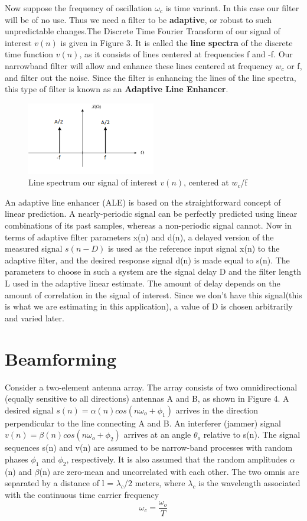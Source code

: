 Now suppose the frequency of oscillation $\omega_c$ is time variant. In this case our filter will be of no use. Thus we need a filter to be \textbf{adaptive}, or robust to such unpredictable changes.The Discrete Time Fourier Transform of our signal of interest $v(n)$ is given in Figure 3. It is called the \textbf{line spectra} of the discrete time function $v(n)$, as it consists of lines centered at frequencies f and -f. Our narrowband filter will allow and enhance these lines centered at frequency $w_c$ or f, and filter out the noise. Since the filter is enhancing the lines of the line spectra, this type of filter is known as an \textbf{Adaptive Line Enhancer}.

\begin{figure}[!ht]
\centering
\includegraphics[width=0.5\textwidth]{cosinedtft.png}
\caption{\label{fig:cosinedtft}Line spectrum our signal of interest $v(n)$, centered at $w_c$/f}
\end{figure}


An adaptive line enhancer (ALE) is based on the straightforward concept of linear prediction. A nearly-periodic signal can be perfectly predicted using linear combinations of its past samples, whereas a non-periodic signal cannot. Now in terms of adaptive filter parameters x(n) and d(n), a delayed version of the measured signal $s(n-D)$ is used as the reference input signal x(n) to the adaptive filter, and the desired response signal d(n) is made equal to s(n). The parameters to choose in such a system are the signal delay D and the filter length L used in the adaptive linear estimate. The amount of delay depends on the amount of correlation in the signal of interest. Since we don't have this signal(this is what we are estimating in this application), a value of D is chosen arbitrarily and varied later.
\section{Beamforming}
Consider a two-element antenna array. The
array consists of two omnidirectional (equally sensitive to all directions) antennas A and
B, as shown in Figure 4. A desired signal $s(n) = \alpha(n) cos(n\omega_o + \phi_1)$ arrives in the
direction perpendicular to the line connecting A and B. An interferer (jammer) signal
$v(n) = \beta(n) cos(n\omega_o+ \phi_2)$ arrives at an angle $\theta_o$ relative to s(n). The signal sequences
s(n) and v(n) are assumed to be narrow-band processes with random phases $\phi_1$ and $\phi_2$,
respectively. It is also assumed that the random amplitudes $\alpha$(n) and $\beta$(n) are zero-mean
and uncorrelated with each other. The two omnis are separated by a distance of l = $\lambda_c$/2
meters, where $\lambda_c$ is the wavelength associated with the continuous time carrier frequency
$$\omega_c = \dfrac{\omega_o}{T}$$


